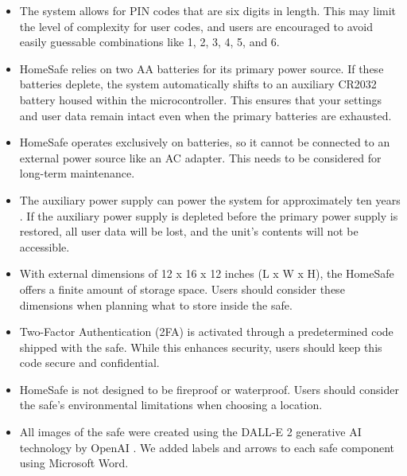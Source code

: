 \documentclass{article}
\begin{document}
\begin{itemize}
    \item The system allows for PIN codes that are six digits in length. This may limit the level of complexity for user codes, and users are encouraged to avoid easily guessable combinations like 1, 2, 3, 4, 5, and 6.
    \item HomeSafe relies on two AA batteries for its primary power source. If these batteries deplete, the system automatically shifts to an auxiliary CR2032 battery housed within the microcontroller. This ensures that your settings and user data remain intact even when the primary batteries are exhausted.
    \item HomeSafe operates exclusively on batteries, so it cannot be connected to an external power source like an AC adapter. This needs to be considered for long-term maintenance.
    \item The auxiliary power supply can power the system for approximately ten years \cite{microbatteryEverythingNeed}. If the auxiliary power supply is depleted before the primary power supply is restored, all user data will be lost, and the unit's contents will not be accessible.
    \item With external dimensions of 12 x 16 x 12 inches (L x W x H), the HomeSafe offers a finite amount of storage space. Users should consider these dimensions when planning what to store inside the safe.
    \item Two-Factor Authentication (2FA) is activated through a predetermined code shipped with the safe. While this enhances security, users should keep this code secure and confidential.
    \item HomeSafe is not designed to be fireproof or waterproof. Users should consider the safe's environmental limitations when choosing a location.
    \item All images of the safe were created using the DALL-E 2 generative AI technology by OpenAI \cite{openaiDALLE}. We added labels and arrows to each safe component using Microsoft Word.
\end{itemize}

\newpage

\printbibliography

{\parindent0pt}
\end{document}
